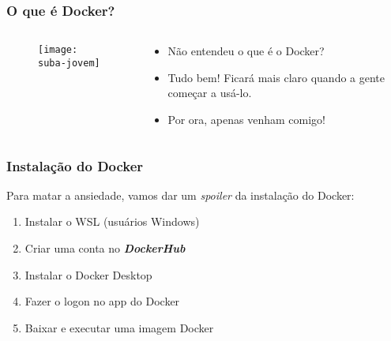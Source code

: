 \documentclass[t, 10pt, aspectratio=169, table, x11names]{beamer}
\begin{document}
	\begin{frame}
		\frametitle{O que é Docker?}
		\begin{columns}[t]
			\begin{column}{0.50\textwidth}
				\vspace{3mm}
				\begin{figure}[h]
					\texttt{[image: suba-jovem]}
				\end{figure}
			\end{column}
			\begin{column}{0.55\textwidth}
				\vspace{7mm}
				\begin{itemize}
					\large
					\item[] Não entendeu o que é o Docker?
					\vspace{3mm}
					\item[] Tudo bem! Ficará mais claro quando a gente começar a usá-lo.
					\vspace{3mm}
					\item[] Por ora, apenas venham comigo!
				\end{itemize}
			\end{column}
			\begin{column}{0.05\textwidth}
			\end{column}
		\end{columns}
	\end{frame}

	\begin{frame}
		\frametitle{Instalação do Docker}
		Para matar a ansiedade, vamos dar um \textit{spoiler} da instalação do Docker:
		\begin{enumerate}
			\item Instalar o WSL (usuários Windows)
			\item Criar uma conta no \textit\textbf{DockerHub}
			\item Instalar o Docker Desktop
			\item Fazer o logon no app do Docker
			\item Baixar e executar uma imagem Docker 
		\end{enumerate}
	\end{frame}
\end{document}
